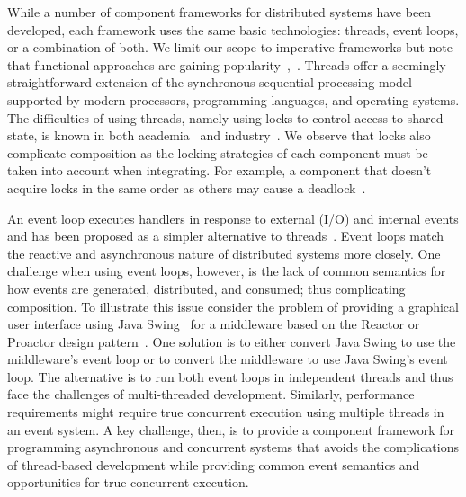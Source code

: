 While a number of component frameworks for distributed systems have been developed, each framework uses the same basic technologies:  threads, event loops, or a combination of both.
We limit our scope to imperative frameworks but note that functional approaches are gaining popularity~\cite{armstrong1996concurrent},~\cite{halloway2009programming}.
Threads offer a seemingly straightforward extension of the synchronous sequential processing model supported by modern processors, programming languages, and operating systems.
The difficulties of using threads, namely using locks to control access to shared state, is known in both academia~\cite{lee2006problem} and industry~\cite{sutter2005free}.
We observe that locks also complicate composition as the locking strategies of each component must be taken into account when integrating.
For example, a component that doesn't acquire locks in the same order as others may cause a deadlock~\cite{havender1968avoiding}.

An event loop executes handlers in response to external (I/O) and internal events and has been proposed as a simpler alternative to threads~\cite{ousterhout1996threads}.
Event loops match the reactive and asynchronous nature of distributed systems more closely.
One challenge when using event loops, however, is the lack of common semantics for how events are generated, distributed, and consumed; thus complicating composition.
To illustrate this issue consider the problem of providing a graphical user interface using Java Swing~\cite{eckstein1998java} for a middleware based on the Reactor or Proactor design pattern~\cite{schmidt2000pattern}.
One solution is to either convert Java Swing to use the middleware's event loop or to convert the middleware to use Java Swing's event loop.
The alternative is to run both event loops in independent threads and thus face the challenges of multi-threaded development.
Similarly, performance requirements might require true concurrent execution using multiple threads in an event system.
A key challenge, then, is to provide a component framework for programming asynchronous and concurrent systems that avoids the complications of thread-based development while providing common event semantics and opportunities for true concurrent execution.

